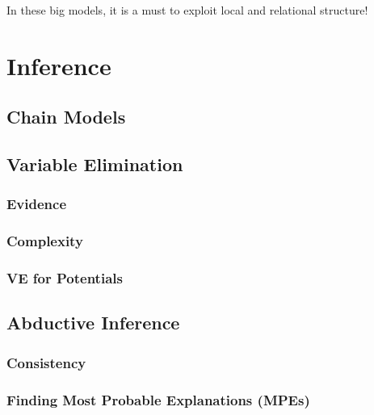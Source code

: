 		In these big models, it is a must to exploit local and relational structure!

\chapter{Inference} %

	\section{Chain Models} %

	\section{Variable Elimination} %

		\subsection{Evidence} %

		\subsection{Complexity} %

		\subsection{VE for Potentials} %

	\section{Abductive Inference} %

		\subsection{Consistency} %

		\subsection{Finding Most Probable Explanations (MPEs)} %

